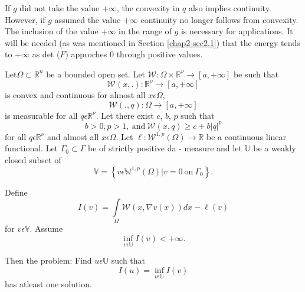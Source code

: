 \begin{remark}\label{chap2-rem2.5.3}%
  If $g$ did not take the value $+ \infty$, the convexity in $q$ also
  implies continuity. However, if $g$ assumed the value $+ \infty$
  continuity no longer follows from convexity. The inclusion of the
  value $+ \infty$ in the range of $g$ is necessary for
  applications. It will be needed (as was mentioned in
  Section \ref{chap2-sec2.1}) 
  that the energy tends to $+ \infty$ as det ($F$) approches 0
  through positive values. 
\end{remark}

\begin{theorem}\label{chap2-thm2.5.2}%
  Let\pageoriginale $\Omega \subset \mathbb{R}^n$ be a bounded open set. Let
  $\mathscr{W}: \Omega \times \mathbb{R}^\nu \rightarrow [a, +
    \infty]$ be such that 
  $$ 
  \mathcal{W}(x,.): \mathbb{R}^\nu \rightarrow [a, + \infty]
  $$
  is convex and continuous for almost all $x \epsilon \Omega$,
  $$ 
  \mathcal{W}(.,q): \Omega \rightarrow [a, + \infty]
  $$
  is measurable for all $q \epsilon \mathbb{R}^\nu$. Let there exist
  $c$, $b$, $p$ such that 
  \begin{equation*}
    b > 0, p > 1, ~\text{and}~ \mathcal{W}(x,q) \ge c +
  b|q|^p \tag{2.5-3}\label{eq2.5.3} 
  \end{equation*}
  for all $q \epsilon \mathbb{R}^\nu$ and almost all $x \epsilon
  \Omega$. Let $\ell : \mathcal{W}^{1,p}(\Omega) \rightarrow \mathbb{R}$
  be a continuous linear functional. Let $\Gamma_0 \subset \Gamma $ be
  of strictly positive da - measure and let $\mathbb{U}$ be a weakly
  closed subset of  
  \begin{equation*}
    \mathbb{V} = \left\{v \epsilon \mathbb{W}^{1,p}(\Omega) | v = 0
    ~\text{on}~ \Gamma_0 \right\}. \tag{2.5-4} \label{eq2.5.4}
  \end{equation*}

 Define
 \begin{equation*}
   I(v) = \int \limits_\Omega \mathcal{W}(x, \nabla v(x)) dx -
   \ell(v ) \tag{2.5-5} \label{eq2.5.5}
 \end{equation*} 
 for $v \epsilon \mathbb{V}$. Assume 
 $$
 \inf \limits_{v \epsilon \mathbb{U}} I(v) < + \infty.
 $$

 Then the problem: Find $u \epsilon \mathbb{U}$ such that 
 \begin{equation*}
   I(u) = \inf \limits_{v \epsilon \mathbb{U}} I(v) \tag{2.5-6}\label{eq2.5.6}
 \end{equation*} 
 has atleast one solution.
 \end{theorem}

